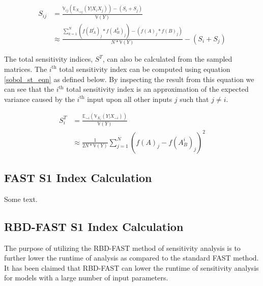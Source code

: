 \begin{equation} \label{sobol_s2_eqn}
  \begin{split}
    S_{ij} & = \frac{\mathbb{V}_{ij}(\mathbb{E}_{X_{\sim ij}}(Y | X_i X_j))  - (S_i + S_j)}{\mathbb{V}(Y)} \\
     & \approx \frac{\sum_{k=1}^{N} (f(B_{A}^{i})_j * f(A_{B}^{k})_j) - (f(A)_j * f(B)_j)}{N * \mathbb{V}(Y)} - (S_i + S_j)
  \end{split}
\end{equation}

The total sensitivity indices, $S^T$, can also be calculated from the sampled matrices. The $i^{\text{th}}$ total sensitivity index can be computed using equation \ref{sobol_st_eqn} as defined below. By inspecting the result from this equation we can see that the $i^{\text{th}}$ total sensitivity index is an approximation of the expected variance caused by the $i^{\text{th}}$ input upon all other inputs $j$ such that $j\neq i$.

\begin{equation} \label{sobol_st_eqn}
  \begin{split}
    S_i^T & = \frac{\mathbb{E}_{\sim i}(\mathbb{V}_{X_i}(Y | X_{\sim i}))}{\mathbb{V}(Y)} \\
    & \approx \frac{1}{2N * \mathbb{V}(Y)} \sum_{j=1}^{N} (f(A)_j - f(A_{B}^{i})_j)^2
  \end{split}
\end{equation}

\subsection{FAST S1 Index Calculation\label{sec:fast_analysis}}
Some text.

\subsection{RBD-FAST S1 Index Calculation\label{sec:rbd_fast_analysis}}
The purpose of utilizing the RBD-FAST method of sensitivity analysis is to further lower the runtime of analysis as compared to the standard FAST method. It has been claimed that RBD-FAST can lower the runtime of sensitivity analysis for models with a large number of input parameters.

